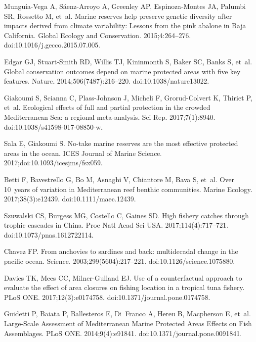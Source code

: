 \documentclass[10pt,letterpaper]{article}
\begin{document}
\begin{thebibliography}{10}
Munguía-Vega A, Sáenz-Arroyo A, Greenley AP, Espinoza-Montes JA, Palumbi SR,
  Rossetto M, et~al.
\newblock Marine reserves help preserve genetic diversity after impacts derived
  from climate variability: Lessons from the pink abalone in Baja California.
\newblock Global Ecology and Conservation. 2015;4:264--276.
\newblock doi:{10.1016/j.gecco.2015.07.005}.

Edgar GJ, Stuart-Smith RD, Willis TJ, Kininmonth S, Baker SC, Banks S, et~al.
\newblock Global conservation outcomes depend on marine protected areas with
  five key features.
\newblock Nature. 2014;506(7487):216--220.
\newblock doi:{10.1038/nature13022}.

Giakoumi S, Scianna C, Plass-Johnson J, Micheli F, Grorud-Colvert K, Thiriet P,
  et~al.
\newblock Ecological effects of full and partial protection in the crowded
  Mediterranean Sea: a regional meta-analysis.
\newblock Sci Rep. 2017;7(1):8940.
\newblock doi:{10.1038/s41598-017-08850-w}.

Sala E, Giakoumi S.
\newblock No-take marine reserves are the most effective protected areas in the
  ocean.
\newblock ICES Journal of Marine Science. 2017;doi:{10.1093/icesjms/fsx059}.

Betti F, Bavestrello G, Bo M, Asnaghi V, Chiantore M, Bava S, et~al.
\newblock Over 10 years of variation in Mediterranean reef benthic
  communities.
\newblock Marine Ecology. 2017;38(3):e12439.
\newblock doi:{10.1111/maec.12439}.

Szuwalski CS, Burgess MG, Costello C, Gaines SD.
\newblock High fishery catches through trophic cascades in China.
\newblock Proc Natl Acad Sci USA. 2017;114(4):717--721.
\newblock doi:{10.1073/pnas.1612722114}.

Chavez FP.
\newblock From anchovies to sardines and back: multidecadal change in the
  pacific ocean.
\newblock Science. 2003;299(5604):217--221.
\newblock doi:{10.1126/science.1075880}.

Davies TK, Mees CC, Milner-Gulland EJ.
\newblock Use of a counterfactual approach to evaluate the effect of area
  closures on fishing location in a tropical tuna fishery.
\newblock PLoS ONE. 2017;12(3):e0174758.
\newblock doi:{10.1371/journal.pone.0174758}.

Guidetti P, Baiata P, Ballesteros E, Di~Franco A, Hereu B, Macpherson E, et~al.
\newblock Large-Scale Assessment of Mediterranean Marine Protected Areas
  Effects on Fish Assemblages.
\newblock PLoS ONE. 2014;9(4):e91841.
\newblock doi:{10.1371/journal.pone.0091841}.


\end{thebibliography}
\end{document}
